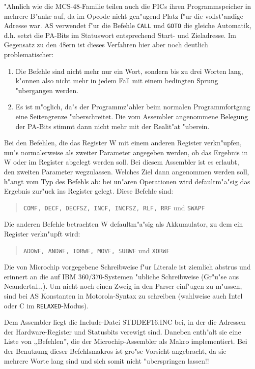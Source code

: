 \documentclass[12pt,a4paper,twoside]{report}
\newcommand{\tty}[1]{{\tt #1}}
\begin{document}
"Ahnlich wie die MCS-48-Familie teilen auch die PICs ihren
Programmspeicher in mehrere B"anke auf, da im Opcode nicht gen"ugend Platz
f"ur die vollst"andige Adresse war.  AS verwendet f"ur die Befehle \tty{CALL}
und \tty{GOTO} die gleiche Automatik, d.h. setzt die PA-Bits im
Statuswort entsprechend Start- und Zieladresse.  Im Gegensatz zu den 48ern
ist dieses Verfahren hier aber noch deutlich problematischer:
\begin{enumerate}
\item{Die Befehle sind nicht mehr nur ein Wort, sondern bis zu drei Worten
      lang, k"onnen also nicht mehr in jedem Fall mit einem bedingten Sprung
      "ubergangen werden.}
\item{Es ist m"oglich, da"s der Programmz"ahler beim normalen
      Programmfortgang eine Seitengrenze "uberschreitet.  Die vom Assembler
      angenommene Belegung der PA-Bits stimmt dann nicht mehr mit der
      Realit"at "uberein.}
\end{enumerate}
Bei den Befehlen, die das Register W mit einem anderen Register
verkn"upfen, mu"s normalerweise als zweiter Parameter angegeben werden, ob
das Ergebnis in W oder im Register abgelegt werden soll.  Bei diesem
Assembler ist es erlaubt, den zweiten Parameter wegzulassen.  Welches Ziel
dann angenommen werden soll, h"angt vom Typ des Befehls ab: bei un"aren
Operationen wird defaultm"a"sig das Ergebnis zur"uck ins Register gelegt.
Diese Befehle sind:
\begin{quote}
{\tt COMF, DECF, DECFSZ, INCF, INCFSZ, RLF, RRF} und {\tt SWAPF}
\end{quote}
Die anderen Befehle betrachten W defaultm"a"sig als Akkumulator, zu dem ein
Register verkn"upft wird:
\begin{quote}
{\tt ADDWF, ANDWF, IORWF, MOVF, SUBWF} und {\tt XORWF}
\end{quote}
\par
Die von Microchip vorgegebene Schreibweise f"ur Literale ist ziemlich
abstrus und erinnert an die auf IBM 360/370-Systemen "ubliche Schreibweise
(Gr"u"se aus Neandertal...).  Um nicht noch einen Zweig in den Parser
einf"ugen zu m"ussen, sind bei AS Konstanten in
Motorola-Syntax zu schreiben (wahlweise auch Intel oder C im \tty{RELAXED}-Modus).
\par
Dem Assembler liegt die Include-Datei STDDEF16.INC bei, in der die Adressen
der Hardware-Register und Statusbits verewigt sind.  Daneben enth"alt sie
eine Liste von ,,Befehlen'', die der Microchip-Assembler als Makro
implementiert.  Bei der Benutzung dieser Befehlsmakros ist gro"se Vorsicht
angebracht, da sie mehrere Worte lang sind und sich somit nicht "uberspringen
lassen!!
\end{document}
